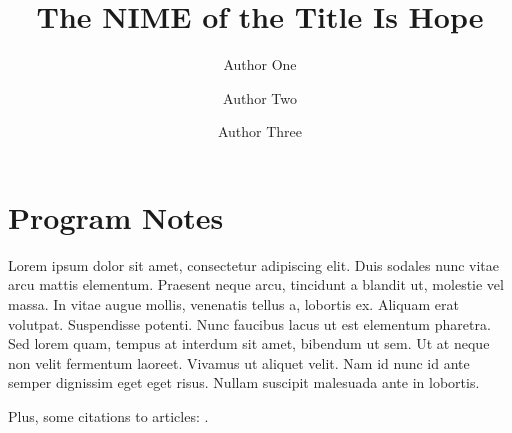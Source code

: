 \documentclass[acmsmall]{nimeart}
\begin{document}
\title{The NIME of the Title Is Hope}

\author{Author One}

\author{Author Two}

\author{Author Three}

\renewcommand{\shortauthors}{First Author's Surname et al.}


\maketitle

\section{Program Notes}

Lorem ipsum dolor sit amet, consectetur adipiscing elit. Duis sodales nunc vitae arcu mattis elementum. Praesent neque arcu, tincidunt a blandit ut, molestie vel massa. In vitae augue mollis, venenatis tellus a, lobortis ex. Aliquam erat volutpat. Suspendisse potenti. Nunc faucibus lacus ut est elementum pharetra. Sed lorem quam, tempus at interdum sit amet, bibendum ut sem. Ut at neque non velit fermentum laoreet. Vivamus ut aliquet velit. Nam id nunc id ante semper dignissim eget eget risus. Nullam suscipit malesuada ante in lobortis.

Plus, some citations to articles: \cite{doe2023,
wizard2022, alien2024}.
\end{document}
